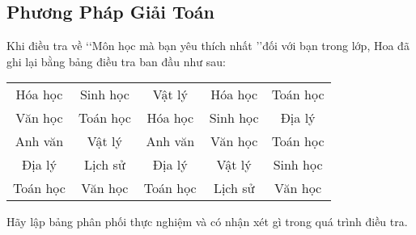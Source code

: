 \subsection{Phương Pháp Giải Toán}
\begin{vd}%
	Khi điều tra về \lq \lq Môn học mà bạn yêu thích nhất \rq \rq đối với bạn trong lớp, Hoa đã ghi lại bằng bảng điều tra ban đầu như sau:
	\begin{center}
		\begin{tabular}{|c|c|c|c|c|}
			\hline 
			Hóa học & Sinh học & Vật lý & Hóa học & Toán học\\ 
			Văn học & Toán học & Hóa học & Sinh học & Địa lý\\ 
			Anh văn & Vật lý & Anh văn & Văn học & Toán học \\
			Địa lý & Lịch sử & Địa lý & Vật lý & Sinh học \\
			Toán học & Văn học & Toán học & Lịch sử & Văn học \\
			\hline 
		\end{tabular}
	\end{center}
Hãy lập bảng phân phối thực nghiệm và có nhận xét gì trong quá trình điều tra.
\end{vd}
